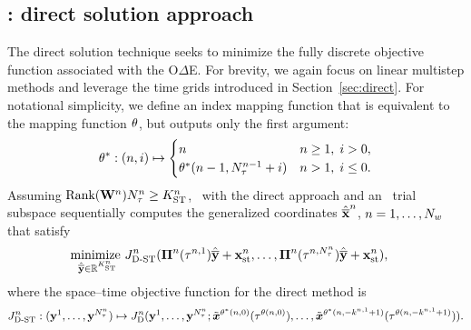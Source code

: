 \subsection{\spaceTimeAcronym: direct solution approach}
The direct solution technique seeks to minimize the fully discrete objective function associated with the O$\Delta$E. For brevity, we again focus on linear multistep methods and leverage the time grids introduced in Section~\ref{sec:direct}. For notational simplicity, we define an index mapping function that is 
equivalent to the mapping function $\theta$, but outputs only the first argument: 
$$\theta^*: (n,i) \mapsto 
\begin{cases}
n & n \ge 1, \; i > 0, \\
\theta^*(n-1,N_{\tau}^{n-1}+i) & n > 1, \; i \le 0.
\end{cases}$$
Assuming $\text{Rank}(\mathbf{W}^{n})N_{\tau}^{n} \ge K_{\text{ST}}^{n}$, \methodAcronym\ with the direct approach and an \spaceTimeAcronym\ trial subspace sequentially computes the generalized coordinates $\hat{\mathbf{\overline{x}}}^{n}$, $n=1,\ldots,N_w$ that satisfy
 \begin{equation}\label{eq:obj_gen_lms_final_st}
\begin{split}
& \underset{\stgenstatey \in \RR{\stdimArg{n}}}{\text{minimize } }
\objectiveArgLMS{n}_{\text{D-ST}} (\stbasisArg{n}{\timeWindowArg{n}{1}} \stgenstatey + \stateInterceptSTArg{n},\ldots,\stbasisArg{n}{\timeWindowArg{n}{\nstepsArg{n}}} \stgenstatey + \stateInterceptSTArg{n}),%
\end{split} 
\end{equation}
where the space--time objective function for the direct method is
$$
J^{n}_{\text{D-ST}}  :  (\mathbf{y}^{1},\ldots,\mathbf{y}^{N_{\tau}^{n}}) \mapsto J^{n}_{\text{D}}(\mathbf{y}^{1},\ldots,\mathbf{y}^{N_{\tau}^{n}}; \tilde{\boldsymbol x}^{\theta^*(n,0)}(\tau^{\theta(n,0)}),\ldots, 
 \tilde{\boldsymbol x}^{\theta^*(n,-k^{n,1}+1)}(\tau^{\theta(n,-k^{n,1}+1)})).
$$
